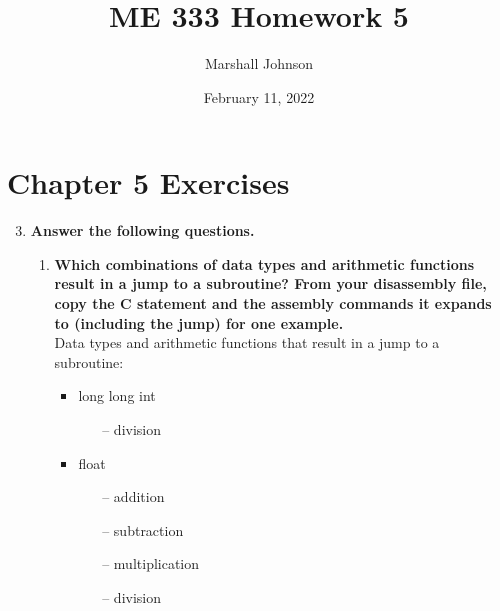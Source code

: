 \documentclass{article}
\title{ME 333 Homework 5}
\author{Marshall Johnson}
\date{February 11, 2022}
\begin{document}
\maketitle

\section*{Chapter 5 Exercises}

\begin{enumerate}[label=\textbf{\arabic*})]
    \setcounter{enumi}{2}
    \item \textbf{Answer the following questions.} \\
    
    \begin{enumerate}[label=\textbf{\alph*}.]
        \item \textbf{Which combinations of data types and arithmetic functions result in a jump to a
        subroutine? From your disassembly file, copy the C statement and the assembly
        commands it expands to (including the jump) for one example.} \\

        Data types and arithmetic functions that result in a jump to a subroutine: \\
        \begin{itemize}
            \item long long int
            \begin{itemize}
                \item[--] division
            \end{itemize}

            \item float
            \begin{itemize}
                \item[--] addition
                \item[--] subtraction
                \item[--] multiplication
                \item[--] division
            \end{itemize}


\end{itemize}
\end{enumerate}
\end{enumerate}
\end{document}
